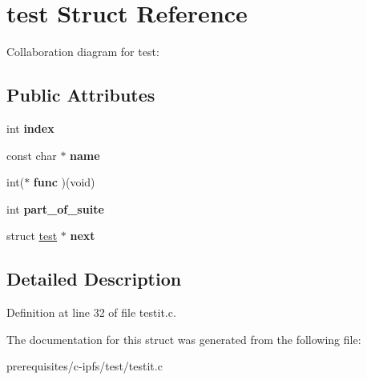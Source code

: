 \hypertarget{structtest}{}\section{test Struct Reference}
\label{structtest}


Collaboration diagram for test\+:
\subsection*{Public Attributes}
\begin{DoxyCompactItemize}
\item 
\mbox{\label{structtest_a8e7d7549f091778f8bdc86f48cdc6ea9}} 
int {\bfseries index}
\item 
\mbox{\label{structtest_a0fbb865dfb70f6f6c35777ab1a37e384}} 
const char $\ast$ {\bfseries name}
\item 
\mbox{\label{structtest_a4bd236d56845b352d271ceebf2ff3f8b}} 
int($\ast$ {\bfseries func} )(void)
\item 
\mbox{\label{structtest_a92d79c08494444ec3fe4628aaa9686a8}} 
int {\bfseries part\+\_\+of\+\_\+suite}
\item 
\mbox{\label{structtest_a0c76f2420cd7825258d95c2734611c82}} 
struct \mbox{\hyperlink{structtest}{test}} $\ast$ {\bfseries next}
\end{DoxyCompactItemize}


\subsection{Detailed Description}


Definition at line 32 of file testit.\+c.



The documentation for this struct was generated from the following file\+:\begin{DoxyCompactItemize}
\item 
prerequisites/c-\/ipfs/test/testit.\+c\end{DoxyCompactItemize}
